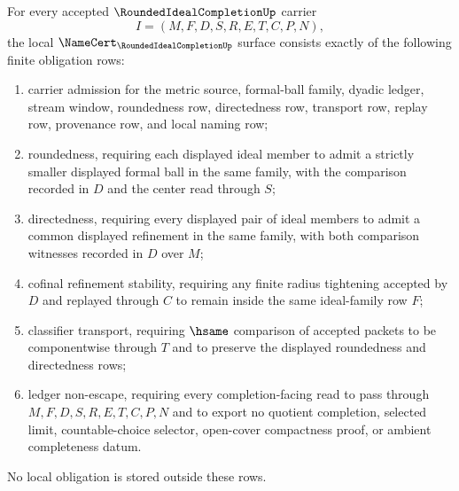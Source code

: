 \begin{theorem}
\label{thm:rounded-ideal-completion-namecert-obligations}
For every accepted $\RoundedIdealCompletionUp$ carrier
$$
I=(M,F,D,S,R,E,T,C,P,N),
$$
the local $\NameCert_{\RoundedIdealCompletionUp}$ surface consists exactly of the following finite obligation rows:
\begin{enumerate}
\item carrier admission for the metric source, formal-ball family, dyadic ledger, stream window, roundedness row, directedness row, transport row, replay row, provenance row, and local naming row;
\item roundedness, requiring each displayed ideal member to admit a strictly smaller displayed formal ball in the same family, with the comparison recorded in $D$ and the center read through $S$;
\item directedness, requiring every displayed pair of ideal members to admit a common displayed refinement in the same family, with both comparison witnesses recorded in $D$ over $M$;
\item cofinal refinement stability, requiring any finite radius tightening accepted by $D$ and replayed through $C$ to remain inside the same ideal-family row $F$;
\item classifier transport, requiring $\hsame$ comparison of accepted packets to be componentwise through $T$ and to preserve the displayed roundedness and directedness rows;
\item ledger non-escape, requiring every completion-facing read to pass through $M,F,D,S,R,E,T,C,P,N$ and to export no quotient completion, selected limit, countable-choice selector, open-cover compactness proof, or ambient completeness datum.
\end{enumerate}
No local obligation is stored outside these rows.
\end{theorem}
